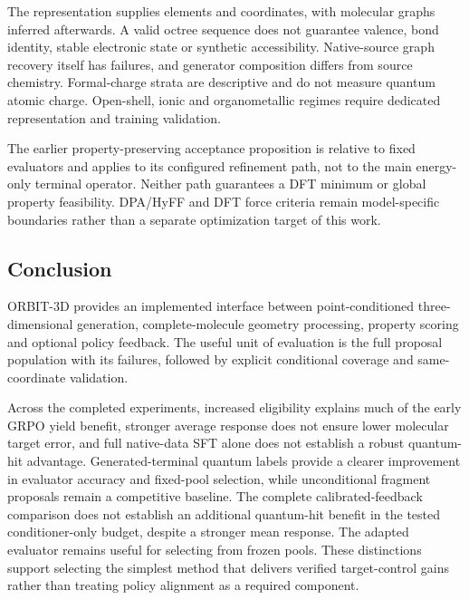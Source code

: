 \documentclass[11pt,a4paper]{article}
\begin{document}
The representation supplies elements and coordinates, with molecular
graphs inferred afterwards. A valid octree sequence does not guarantee
valence, bond identity, stable electronic state or synthetic
accessibility. Native-source graph recovery itself has failures, and
generator composition differs from source chemistry. Formal-charge
strata are descriptive and do not measure quantum atomic charge.
Open-shell, ionic and organometallic regimes require dedicated
representation and training validation.

The earlier property-preserving acceptance proposition is relative to
fixed evaluators and applies to its configured refinement path, not to
the main energy-only terminal operator. Neither path guarantees a DFT
minimum or global property feasibility. DPA/HyFF and DFT force criteria
remain model-specific boundaries rather than a separate optimization
target of this work.

\begin{samepage}
\section{Conclusion}\label{conclusion}

ORBIT-3D provides an implemented interface between point-conditioned
three-dimensional generation, complete-molecule geometry processing,
property scoring and optional policy feedback. The useful unit of
evaluation is the full proposal population with its failures, followed
by explicit conditional coverage and same-coordinate validation.

Across the completed experiments, increased eligibility explains much of
the early GRPO yield benefit, stronger average response does not ensure
lower molecular target error, and full native-data SFT alone does not
establish a robust quantum-hit advantage. Generated-terminal quantum
labels provide a clearer improvement in evaluator accuracy and
fixed-pool selection, while unconditional fragment proposals remain a
competitive baseline. The complete calibrated-feedback comparison does
not establish an additional quantum-hit benefit in the tested
conditioner-only budget, despite a stronger mean response. The adapted
evaluator remains useful for selecting from frozen pools. These
distinctions support selecting the simplest method that delivers
verified target-control gains rather than treating policy alignment as a
required component.

\end{samepage}
\appendix
\end{document}
